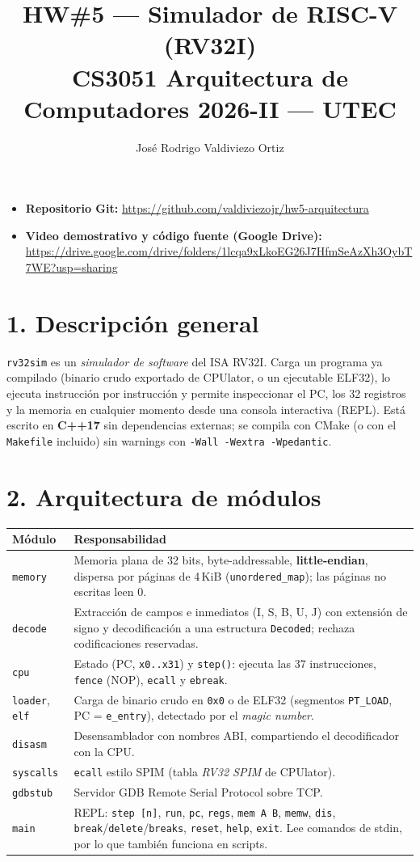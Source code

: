 \documentclass[11pt,a4paper]{article}
\title{\textbf{HW\#5 --- Simulador de RISC-V (RV32I)}\\[2pt]
\large CS3051 Arquitectura de Computadores 2026-II --- UTEC}
\author{José Rodrigo Valdiviezo Ortiz}
\date{}
\newcommand{\toprule}{\hline}\newcommand{\midrule}{\hline}\newcommand{\bottomrule}{\hline}}
\newcommand{\repourl}{\url{https://github.com/valdiviezojr/hw5-arquitectura}}
\newcommand{\driveurl}{\url{https://drive.google.com/drive/folders/1lcqa9xLkoEG26J7HfmSeAzXh3OybT7WE?usp=sharing}}
\begin{document}
\maketitle
\vspace{-1.5em}

\begin{itemize}
  \item \textbf{Repositorio Git:} \repourl
  \item \textbf{Video demostrativo y código fuente (Google Drive):} \driveurl
\end{itemize}

\section*{1. Descripción general}
\texttt{rv32sim} es un \emph{simulador de software} del ISA RV32I. Carga un programa ya
compilado (binario crudo exportado de CPUlator, o un ejecutable ELF32), lo ejecuta instrucción
por instrucción y permite inspeccionar el PC, los 32 registros y la memoria en cualquier momento
desde una consola interactiva (REPL). Está escrito en \textbf{C++17} sin dependencias externas;
se compila con CMake (o con el \texttt{Makefile} incluido) sin warnings con
\texttt{-Wall -Wextra -Wpedantic}.

\section*{2. Arquitectura de módulos}
\begin{tabularx}{\linewidth}{@{}lX@{}}
\toprule
\textbf{Módulo} & \textbf{Responsabilidad} \\
\midrule
\texttt{memory} & Memoria plana de 32 bits, byte-addressable, \textbf{little-endian}, dispersa por
  páginas de 4\,KiB (\texttt{unordered\_map}); las páginas no escritas leen 0. \\
\texttt{decode} & Extracción de campos e inmediatos (I, S, B, U, J) con extensión de signo y
  decodificación a una estructura \texttt{Decoded}; rechaza codificaciones reservadas. \\
\texttt{cpu} & Estado (PC, \texttt{x0..x31}) y \texttt{step()}: ejecuta las 37 instrucciones,
  \texttt{fence} (NOP), \texttt{ecall} y \texttt{ebreak}. \\
\texttt{loader}, \texttt{elf} & Carga de binario crudo en \texttt{0x0} o de ELF32 (segmentos
  \texttt{PT\_LOAD}, PC = \texttt{e\_entry}), detectado por el \emph{magic number}. \\
\texttt{disasm} & Desensamblador con nombres ABI, compartiendo el decodificador con la CPU. \\
\texttt{syscalls} & \texttt{ecall} estilo SPIM (tabla \emph{RV32 SPIM} de CPUlator). \\
\texttt{gdbstub} & Servidor GDB Remote Serial Protocol sobre TCP. \\
\texttt{main} & REPL: \texttt{step [n]}, \texttt{run}, \texttt{pc}, \texttt{regs}, \texttt{mem A B},
  \texttt{memw}, \texttt{dis}, \texttt{break}/\texttt{delete}/\texttt{breaks}, \texttt{reset},
  \texttt{help}, \texttt{exit}. Lee comandos de stdin, por lo que también funciona en scripts. \\
\bottomrule
\end{tabularx}
\end{document}
